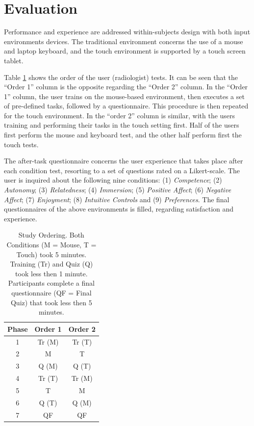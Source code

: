 \documentclass{sigchi}
\newcommand\tabhead[1]{\small\textbf{#1}}
\begin{document}
\section{Evaluation}

Performance and experience are addressed within-subjects design with both input environments devices. The traditional environment concerns the use of a mouse and laptop keyboard, and the touch environment is supported by a touch screen tablet.

Table \ref{tab:Tab1} shows the order of the user (radiologist) tests. It can be seen that the ``Order 1'' column is the opposite regarding the ``Order 2'' column. In the ``Order 1'' column, the user trains on the mouse-based environment, then executes a set of pre-defined tasks, followed by a questionnaire. This procedure is then repeated for the touch environment. In the ``order 2'' column is similar, with the users training and performing their tasks in the touch setting first. Half of the users first perform the mouse and keyboard test, and the other half perform first the touch tests.

The after-task questionnaire concerns the user experience that takes place after each condition test, resorting to a set of questions rated on a Likert-scale. The user is inquired about the following nine conditions: (1) \textit{Competence}; (2) \textit{Autonomy}; (3) \textit{Relatedness}; (4) \textit{Immersion}; (5) \textit{Positive Affect}; (6) \textit{Negative Affect}; (7) \textit{Enjoyment}; (8) \textit{Intuitive Controls} and (9) \textit{Preferences}. The final questionnaires of the above environments is filled, regarding satisfaction and experience.

\begin{table}
  \centering
  \def\arraystretch{1.5}
  \begin{tabular}{|c|c|c|}
    \hline
    \tabhead{Phase} &
    \multicolumn{1}{|p{0.3\columnwidth}|}{\centering\tabhead{Order 1}} &
    \multicolumn{1}{|p{0.3\columnwidth}|}{\centering\tabhead{Order 2}} \\
    \hline
    1 & Tr (M) & Tr (T) \\
    \hline
    2 & M & T \\
    \hline
    3 & Q (M) & Q (T) \\
    \hline
    4 & Tr (T) & Tr (M) \\
    \hline
    5 & T & M \\
    \hline
    6 & Q (T) & Q (M) \\
    \hline
    7 & QF & QF \\
    \hline
  \end{tabular}
  \caption{Study Ordering. Both Conditions (M = Mouse, T = Touch) took 5 minutes. Training (Tr) and Quiz (Q) took less then 1 minute. Participants complete a final questionnaire (QF = Final Quiz) that took less then 5 minutes.}
  \label{tab:Tab1}
\end{table}
\end{document}
